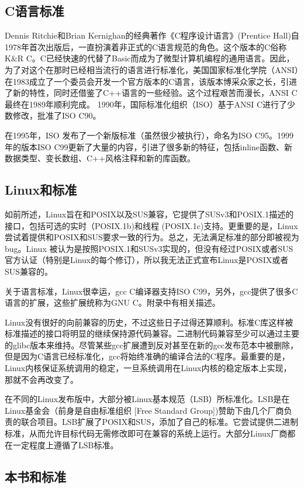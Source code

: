 \subsection{C语言标准}
Dennis Ritchie和Brian Kernighan的经典著作《C程序设计语言》(Prentice Hall)自1978年首次出版后，一直扮演着非正式的C语言规范的角色。这个版本的C俗称K\&R C。C已经快速的代替了Basic而成为了微型计算机编程的通用语言。因此，为了对这个在那时已经相当流行的语言进行标准化，美国国家标准化学院（ANSI）在1983成立了一个委员会开发一个官方版本的C语言，该版本博采众家之长，引进了新的特性，同时还借鉴了C++语言的一些经验。这个过程艰苦而漫长，ANSI C最终在1989年顺利完成。 1990年，国际标准化组织（ISO）基于ANSI C进行了少数修改，批准了ISO C90。

在1995年，ISO 发布了一个新版标准（虽然很少被执行），命名为ISO C95。1999年的版本ISO C99更新了大量的内容，引进了很多新的特征，包括inline函数、新数据类型、变长数组、C++风格注释和新的库函数。 

\subsection{Linux和标准}

如前所述，Linux旨在和POSIX以及SUS兼容，它提供了SUSv3和POSIX.1描述的接口，包括可选的实时（POSIX.1b)和线程 (POSIX.1c)支持。更重要的是，Linux尝试着提供和POSIX和SUS要求一致的行为。总之，无法满足标准的部分即被视为bug。Linux 被认为是按照POSIX.1和SUSv3实现的，但没有经过POSIX或者SUS官方认证（特别是Linux的每个修订），所以我无法正式宣布Linux是POSIX或者SUS兼容的。


关于语言标准，Linux很幸运，gcc C编译器支持ISO C99，另外，gcc提供了很多C语言的扩展，这些扩展统称为GNU C。附录中有相关描述。

Linux没有很好的向前兼容的历史，不过这些日子过得还算顺利。标准C库这样被标准描述的接口将明显的继续保持源代码兼容。二进制代码兼容至少可以通过主要的glibc版本来维持。尽管某些gcc扩展遭到反对甚至在新的gcc发布范本中被删除，但是因为C语言已经标准化，gcc将始终准确的编译合法的C程序。最重要的是，Linux内核保证系统调用的稳定，一旦系统调用在Linux内核的稳定版本上实现，那就不会再改变了。

在不同的Linux发布版中，大部分被Linux基本规范（LSB）所标准化。LSB是在Linux基金会（前身是自由标准组织 [Free Standard Group])赞助下由几个厂商负责的联合项目。LSB扩展了POSIX和SUS，添加了自己的标准。它尝试提供二进制标准，从而允许目标代码无需修改即可在兼容的系统上运行。大部分Linux厂商都在一定程度上遵循了LSB标准。

\subsection{本书和标准}

